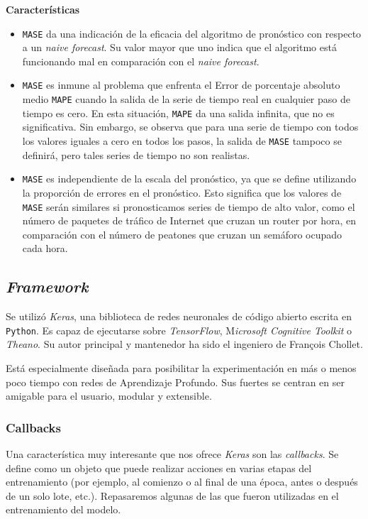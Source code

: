 \documentclass[a4paper,12pt]{article}
\begin{document}
\textbf{Características}
\begin{itemize}
	\item \texttt{MASE} da una indicación de la eficacia del algoritmo de pronóstico con respecto a un \textit{naive forecast}. Su valor mayor que uno indica que el algoritmo está funcionando mal en comparación con el \textit{naive forecast}.

	\item \texttt{MASE} es inmune al problema que enfrenta el Error de porcentaje absoluto medio \texttt{MAPE} cuando la salida de la serie de tiempo real en cualquier paso de tiempo es cero. En esta situación, \texttt{MAPE} da una salida infinita, que no es significativa. Sin embargo, se observa que para una serie de tiempo con todos los valores iguales a cero en todos los pasos, la salida de \texttt{MASE} tampoco se definirá, pero tales series de tiempo no son realistas.
	
	\item \texttt{MASE} es independiente de la escala del pronóstico, ya que se define utilizando la proporción de errores en el pronóstico. Esto significa que los valores de \texttt{MASE} serán similares si pronosticamos series de tiempo de alto valor, como el número de paquetes de tráfico de Internet que cruzan un router por hora, en comparación con el número de peatones que cruzan un semáforo ocupado cada hora.
\end{itemize}

\subsection{\textit{Framework}}

Se utilizó \textit{Keras}, una biblioteca de redes neuronales de código abierto escrita en \texttt{Python}. Es capaz de ejecutarse sobre \textit{TensorFlow}, M\textit{icrosoft Cognitive Toolkit} o \textit{Theano}. Su autor principal y mantenedor ha sido el ingeniero de François Chollet.

Está especialmente diseñada para posibilitar la experimentación en más o menos poco tiempo con redes de Aprendizaje Profundo. Sus fuertes se centran en ser amigable para el usuario, modular y extensible. \citep{keras-wiki}

\subsubsection{Callbacks}
Una característica muy interesante que nos ofrece \textit{Keras} son las \textit{callbacks}. Se define como un objeto que puede realizar acciones en varias etapas del entrenamiento (por ejemplo, al comienzo o al final de una época, antes o después de un solo lote, etc.). Repasaremos algunas de las que fueron utilizadas en el entrenamiento del modelo. \citep{callbacks}
\end{document}
